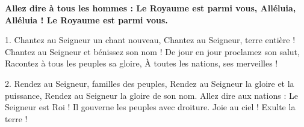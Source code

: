 \textbf{Allez dire à tous les hommes :
Le Royaume est parmi vous,
Alléluia, Alléluia !
Le Royaume est parmi vous.
}

1.
Chantez au Seigneur un chant nouveau,
Chantez au Seigneur, terre entière !
Chantez au Seigneur et bénissez son nom !
De jour en jour proclamez son salut,
Racontez à tous les peuples sa gloire,
À toutes les nations, ses merveilles !

2.
Rendez au Seigneur, familles des peuples,
Rendez au Seigneur la gloire et la puissance,
Rendez au Seigneur la gloire de son nom.
Allez dire aux nations : \og Le Seigneur est Roi !\fg{}
Il gouverne les peuples avec droiture.
Joie au ciel ! Exulte la terre !


